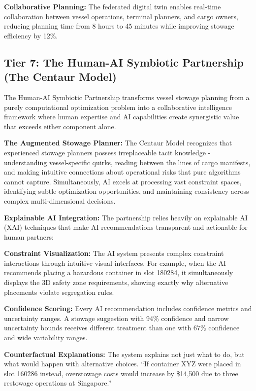\documentclass{article}
\begin{document}
\textbf{Collaborative Planning:} The federated digital twin enables real-time collaboration between vessel operations, terminal planners, and cargo owners, reducing planning time from 8 hours to 45 minutes while improving stowage efficiency by 12\%.

\subsection{Tier 7: The Human-AI Symbiotic Partnership (The Centaur Model)}

The Human-AI Symbiotic Partnership transforms vessel stowage planning from a purely computational optimization problem into a collaborative intelligence framework where human expertise and AI capabilities create synergistic value that exceeds either component alone.

\textbf{The Augmented Stowage Planner:}
The Centaur Model recognizes that experienced stowage planners possess irreplaceable tacit knowledge - understanding vessel-specific quirks, reading between the lines of cargo manifests, and making intuitive connections about operational risks that pure algorithms cannot capture. Simultaneously, AI excels at processing vast constraint spaces, identifying subtle optimization opportunities, and maintaining consistency across complex multi-dimensional decisions.

\textbf{Explainable AI Integration:}
The partnership relies heavily on explainable AI (XAI) techniques that make AI recommendations transparent and actionable for human partners:

\textbf{Constraint Visualization:} The AI system presents complex constraint interactions through intuitive visual interfaces. For example, when the AI recommends placing a hazardous container in slot 180284, it simultaneously displays the 3D safety zone requirements, showing exactly why alternative placements violate segregation rules.

\textbf{Confidence Scoring:} Every AI recommendation includes confidence metrics and uncertainty ranges. A stowage suggestion with 94\% confidence and narrow uncertainty bounds receives different treatment than one with 67\% confidence and wide variability ranges.

\textbf{Counterfactual Explanations:} The system explains not just what to do, but what would happen with alternative choices. ``If container XYZ were placed in slot 160286 instead, overstowage costs would increase by \$14,500 due to three restowage operations at Singapore.''
\end{document}
